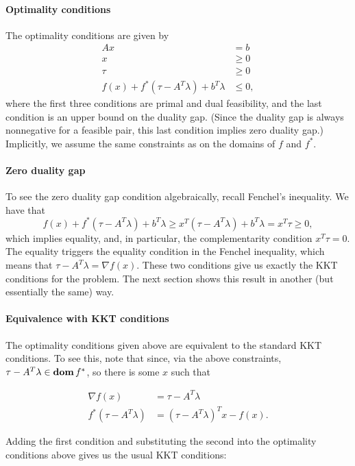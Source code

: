 \documentclass{article}
\begin{document}
\paragraph{Optimality conditions}
The optimality conditions are given by
\begin{align*}
A x &= b \\
x &\geq 0 \\
\tau &\geq 0 \\
f(x) + f^*(\tau - A^T \lambda) + b^T \lambda &\leq 0,
\end{align*}
where the first three conditions are primal and dual feasibility,
and the last condition is an upper bound on the duality gap.
(Since the duality gap is always nonnegative for a feasible pair,
this last condition implies zero duality gap.)
Implicitly, we assume the same constraints as on the domains of $f$ and $f^*$.

\paragraph{Zero duality gap}
To see the zero duality gap condition algebraically, recall Fenchel's inequality.
We have that
\[
f(x) + f^*(\tau - A^T \lambda) + b^T\lambda \geq x^T (\tau - A^T \lambda) + b^T\lambda
= x^T \tau \geq 0,
\]
which implies equality, and, in particular, the complementarity condition
$x^T \tau = 0$.
The equality triggers the equality condition in the Fenchel inequality, which
means that $\tau - A^T \lambda = \nabla f(x)$.
These two conditions give us
exactly the KKT conditions for the problem.
The next section shows this result in another (but essentially the same) way.

\paragraph{Equivalence with KKT conditions}
The optimality conditions given above are equivalent to the standard KKT
conditions. To see this, note that since, via the above constraints,
$\tau - A^T \lambda \in \mathop{\bf dom} f^*$, so there is some $x$ such that

\begin{align*}
\nabla f(x) &= \tau - A^T \lambda \\
f^*(\tau - A^T \lambda) &= \left( \tau - A^T \lambda \right)^T x - f(x).
\end{align*}

Adding the first condition and substituting the second into the optimality
conditions above gives us the usual KKT conditions:
\end{document}
